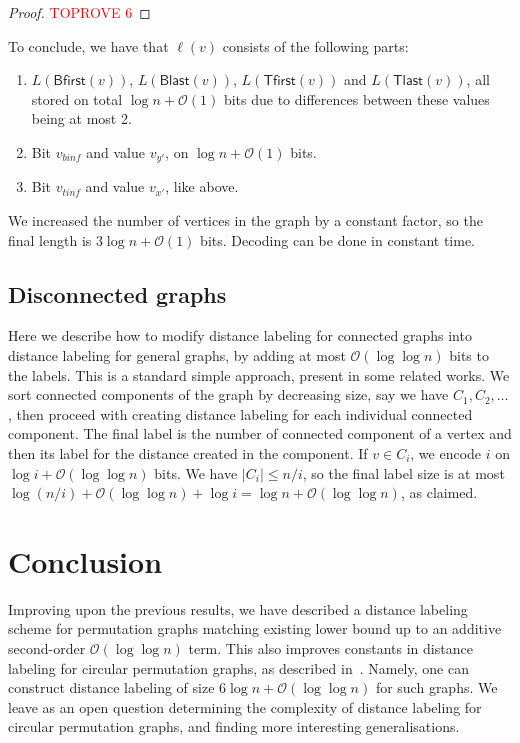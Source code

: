 \documentclass[a4paper,11pt]{article}
\newcommand{\Oh}{\mathcal{O}}
\newcommand{\Blast}{\mathsf{Blast}}
\newcommand{\Bfirst}{\mathsf{Bfirst}}
\newcommand{\Tlast}{\mathsf{Tlast}}
\newcommand{\Tfirst}{\mathsf{Tfirst}}
\begin{document}
\begin{proof}\textcolor{red}{TOPROVE 6}\end{proof}

To conclude, we have that $\ell(v)$ consists of the following parts:
\begin{enumerate}
\item $L(\Bfirst(v))$, $L(\Blast(v))$, $L(\Tfirst(v))$ and $L(\Tlast(v))$, all stored on total $\log{n}+\Oh(1)$ bits
due to differences between these values being at most 2.
\item Bit $v_{binf}$ and value $v_{y'}$, on $\log{n}+\Oh(1)$ bits.
\item Bit $v_{tinf}$ and value $v_{x'}$, like above.
\end{enumerate}

We increased the number of vertices in the graph by a constant factor, so the final length is $3\log{n}+\Oh(1)$ bits.
Decoding can be done in constant time.

\subsection{Disconnected graphs}
Here we describe how to modify distance labeling for connected graphs into distance labeling for general graphs,
by adding at most $\Oh(\log{\log{n}})$ bits to the labels.
This is a standard simple approach, present in some related works.
We sort connected components of the graph by decreasing size, say we have $C_1,C_2,\ldots$,
then proceed with creating distance labeling for each individual connected component.
The final label is the number of connected component of a vertex and then its label for the distance created in the component.
If $v \in C_i$, we encode $i$ on $\log{i}+\Oh(\log{\log{n}})$ bits.
We have $|C_i| \leq n/i$, so the final label size is at most $\log{(n/i)}+\Oh(\log{\log{n}})+\log{i}=\log{n}+\Oh(\log{\log{n}})$, as claimed.



\section{Conclusion}
Improving upon the previous results, we have described a distance labeling scheme for permutation graphs matching existing
lower bound up to an additive second-order $\Oh(\log{\log{n}})$ term.
This also improves constants in distance labeling for circular permutation graphs, as described in~\cite{BazzaroG05}.
Namely, one can construct distance labeling of size $6\log{n}+\Oh(\log{\log{n}})$ for such graphs.
We leave as an open question determining the complexity of distance labeling for circular permutation graphs,
and finding more interesting generalisations.






\end{document}
